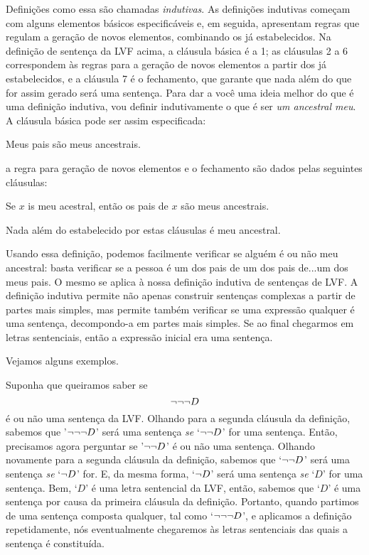 Definições como essa são chamadas \emph{indutivas}.
As definições indutivas começam com alguns elementos básicos especificáveis e, em seguida, apresentam regras que regulam a geração de novos elementos, combinando os já estabelecidos.
Na definição de sentença da LVF acima, a cláusula básica é a 1; as cláusulas 2 a 6 correspondem às regras para a geração de novos elementos a partir dos já estabelecidos, e a cláusula 7 é o fechamento, que garante que nada além do que for assim gerado será uma sentença.
Para dar a você uma ideia melhor do que é uma definição indutiva, vou definir indutivamente o que é ser \emph{um ancestral meu}.
A cláusula básica pode ser assim especificada:
	\begin{ebullet}
		\item Meus pais são meus ancestrais.
	\end{ebullet}
a regra para geração de novos elementos e o fechamento são dados pelas seguintes cláusulas:
	\begin{ebullet}
		\item Se $x$ is meu acestral, então os pais de $x$ são meus ancestrais.
		\item Nada além do estabelecido por estas cláusulas é meu ancestral.
	\end{ebullet}
Usando essa definição, podemos facilmente verificar se alguém é ou não meu ancestral:
basta verificar se a pessoa é um dos pais de um dos pais de...um dos meus pais.
O mesmo se aplica à nossa definição indutiva de sentenças de LVF.
A definição indutiva permite não apenas construir sentenças complexas a partir de partes mais simples, mas permite também verificar se uma expressão qualquer é uma sentença, decompondo-a em partes mais simples. Se ao final chegarmos em letras sentenciais, então a expressão inicial era uma sentença.

Vejamos alguns exemplos.

Suponha que queiramos saber se
$$\neg\neg\neg D$$
é ou não uma sentença da LVF.
Olhando para a segunda cláusula da definição, sabemos que '$\neg\neg\neg D$' será uma sentença \emph{se} `$\neg\neg D$' for uma sentença.
Então, precisamos agora perguntar se '$\neg\neg D$' é ou não uma sentença.
Olhando novamente para a segunda cláusula da definição, sabemos que `$\neg\neg D$' será uma sentença \emph{se} `$\neg D$' for.
E, da mesma forma, `$\neg D$' será uma sentença \emph{se} `$D$' for uma sentença.
Bem, `$D$' é uma letra sentencial da LVF, então, sabemos que `$D$' é uma sentença por causa da primeira cláusula da definição.
Portanto, quando partimos de uma sentença composta qualquer, tal como `$\neg\neg\neg D$', e aplicamos a definição repetidamente, nós eventualmente chegaremos às letras sentenciais das quais a sentença é constituída.

